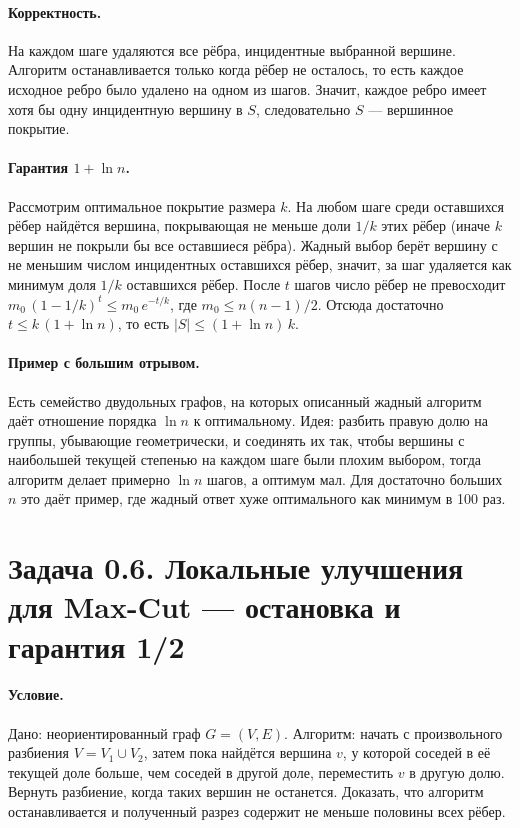 \documentclass[12pt]{article}
\begin{document}
  \paragraph{Корректность.}
  На каждом шаге удаляются все рёбра, инцидентные выбранной вершине. Алгоритм останавливается только когда рёбер не осталось, то есть каждое исходное ребро было удалено на одном из шагов. Значит, каждое ребро имеет хотя бы одну инцидентную вершину в $S$, следовательно $S$ — вершинное покрытие.

  \paragraph{Гарантия $1+\ln n$.}
  Рассмотрим оптимальное покрытие размера $k$. На любом шаге среди оставшихся рёбер найдётся вершина, покрывающая не меньше доли $1/k$ этих рёбер (иначе $k$ вершин не покрыли бы все оставшиеся рёбра). Жадный выбор берёт вершину с не меньшим числом инцидентных оставшихся рёбер, значит, за шаг удаляется как минимум доля $1/k$ оставшихся рёбер. После $t$ шагов число рёбер не превосходит $m_0\,(1-1/k)^t\le m_0\,e^{-t/k}$, где $m_0\le n(n-1)/2$. Отсюда достаточно $t\le k\,(1+\ln n)$, то есть $|S|\le (1+\ln n)\,k$.

  \paragraph{Пример с большим отрывом.}
  Есть семейство двудольных графов, на которых описанный жадный алгоритм даёт отношение порядка $\ln n$ к оптимальному. Идея: разбить правую долю на группы, убывающие геометрически, и соединять их так, чтобы вершины с наибольшей текущей степенью на каждом шаге были плохим выбором, тогда алгоритм делает примерно $\ln n$ шагов, а оптимум мал. Для достаточно больших $n$ это даёт пример, где жадный ответ хуже оптимального как минимум в 100 раз.

  \section*{Задача 0.6. Локальные улучшения для Max-Cut — остановка и гарантия 1/2}

  \paragraph{Условие.}
  Дано: неориентированный граф $G=(V,E)$. Алгоритм: начать с произвольного разбиения $V=V_1\cup V_2$, затем пока найдётся вершина $v$, у которой соседей в её текущей доле больше, чем соседей в другой доле, переместить $v$ в другую долю. Вернуть разбиение, когда таких вершин не останется. Доказать, что алгоритм останавливается и полученный разрез содержит не меньше половины всех рёбер.
\end{document}
